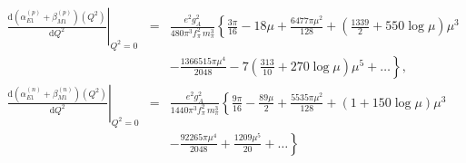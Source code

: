 \documentclass[12pt,preprint,tightenlines,
showpacs,preprintnumbers,amsmath,amssymb,
a4paper,nofootinbib]{revtex4-1}
\def\bea{\begin{eqnarray}}
\def\eea{\end{eqnarray}}
\def\nn{\nonumber}
\def\dd{\mathrm{d}}
\begin{document}
\bea
\left.\frac{\dd\left(\alpha_{E1}^{(p)}+\beta_{M1}^{(p)}\right) (Q^2)}{\dd Q^2}\right|_{Q^2=0}
&=& \frac{e^2 g_A^2}{480 \pi^3 f_\pi^2\,  m_\pi^3} \left\{  \frac{3 \pi}{16} -18 \mu + \frac{6477 \pi \mu^2}{128} + \left( \frac{1339}{2} + 550 \log\mu\right)\!\mu^3 \right.  \\ 
&& \left. -\frac{1366515 \pi \mu^4}{2048}-7\left( \frac{313}{10} + 270 \log\mu  \right)\mu^5 +\dots  \right\},\nonumber\\
\left.\frac{\dd\left(\alpha_{E1}^{(n)}+\beta_{M1}^{(n)}\right) (Q^2)}{\dd Q^2}\right|_{Q^2=0}&=&
 \frac{e^2 g_A^2}{1440 \pi^3 f_\pi^2\,  m_\pi^3} \left\{  \frac{9 \pi}{16} -\frac{89 \mu}{2} + \frac{5535 \pi \mu^2}{128} + \left( 1+ 150 \log\mu\right)\mu^3 \right.\\
 &&\left.-\frac{92265  \pi \mu^4}{2048}  +  \frac{1209 \mu^5}{20} +\dots  \right\}\nn
\eea
\end{document}
